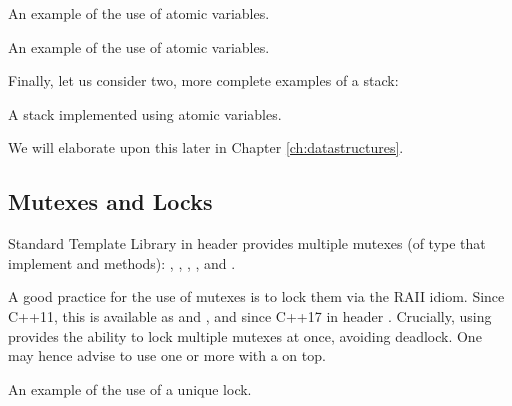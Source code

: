 \begin{itemize}
\begin{end}
\raggedbottom
\begin{codebox}[]{\href{https://godbolt.org/z/Ezqo4G7Ec}{\ExternalLink}}
\footnotesize An example of the use of atomic variables.
\tcblower
{}
\end{codebox}

\raggedbottom
\begin{codebox}[]{\href{https://godbolt.org/z/M8vbK1zjT}{\ExternalLink}}
\footnotesize An example of the use of atomic variables.
\tcblower
{}
\end{codebox}

Finally, let us consider two, more complete examples of a stack:

\raggedbottom
\begin{codebox}[]{\href{https://godbolt.org/z/Yf7a7G4YG}{\ExternalLink}}
\footnotesize A stack implemented using atomic variables.
\tcblower
{}
\end{codebox}

We will elaborate upon this later in Chapter \ref{ch:datastructures}. 

\subsection{Mutexes and Locks}

Standard Template Library in header 	provides multiple mutexes (of type  that implement  and  methods): , , , , 
and . 

A good practice for the use of mutexes is to lock them via the RAII idiom. Since C++11, this is available as  and , and since C++17  in header .
Crucially, using  provides the ability to lock multiple mutexes at once, avoiding deadlock.
One may hence advise to use one or more  with a  on top. 

\raggedbottom
\begin{codebox}[]{\href{https://godbolt.org/z/85Md13Mea}{\ExternalLink}}
\footnotesize An example of the use of a unique lock.
\tcblower
{}
\end{codebox}



\end{end}
\end{itemize}
